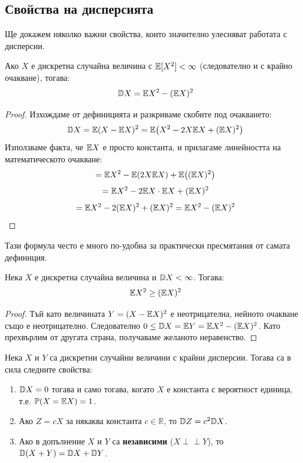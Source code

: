 \subsection{Свойства на дисперсията}

Ще докажем няколко важни свойства, които значително улесняват работата с дисперсии.

\begin{keythm}
Ако $X$ е дискретна случайна величина с $\mathbb{E}[X^2]<\infty$ (следователно и с крайно
очакване), тогава:
\[ \mathbb{D} X = \mathbb{E} X^2 - (\mathbb{E} X)^2 \]
\end{keythm}

\begin{proof}
Изхождаме от дефиницията и разкриваме скобите под очакването:
\[ \mathbb{D} X = \mathbb{E}(X - \mathbb{E} X)^2 = \mathbb{E}\big( X^2 - 2X\mathbb{E} X + (\mathbb{E} X)^2 \big) \]
Използваме факта, че $\mathbb{E} X$ е просто константа, и прилагаме линейността на математическото очакване:
\[ = \mathbb{E} X^2 - \mathbb{E}(2X\mathbb{E} X) + \mathbb{E}\big( (\mathbb{E} X)^2 \big) \]
\[ = \mathbb{E} X^2 - 2\mathbb{E} X \cdot \mathbb{E} X + (\mathbb{E} X)^2 \]
\[ = \mathbb{E} X^2 - 2(\mathbb{E} X)^2 + (\mathbb{E} X)^2 = \mathbb{E} X^2 - (\mathbb{E} X)^2 \]
\end{proof}

Тази формула често е много по-удобна за практически пресмятания от самата дефиниция.

\begin{cor}
Нека $X$ е дискретна случайна величина и $\mathbb{D} X < \infty$. Тогава:
\[ \mathbb{E} X^2 \ge (\mathbb{E} X)^2 \]
\end{cor}

\begin{proof}
Тъй като величината $Y = (X - \mathbb{E} X)^2$ е неотрицателна, нейното очакване също е неотрицателно. Следователно $0 \le \mathbb{D} X = \mathbb{E} Y = \mathbb{E} X^2 - (\mathbb{E} X)^2$. Като прехвърлим от другата страна, получаваме желаното неравенство.
\end{proof}

\begin{prop}\label{prop:var-props}
Нека $X$ и $Y$ са дискретни случайни величини с крайни дисперсии. Тогава са в сила следните свойства:
\begin{enumerate}
    \item[а)] $\mathbb{D} X = 0$ тогава и само тогава, когато $X$ е константа с вероятност
    единица, т.е. $\mathbb{P}(X = \mathbb{E} X) = 1$.
    \item[б)] Ако $Z = cX$ за някаква константа $c \in \mathbb{R}$, то $\mathbb{D} Z = c^2 \mathbb{D} X$.
    \item[в)] Ако в допълнение $X$ и $Y$ са \textbf{независими} ($X \perp\!\!\!\perp Y$), то $\mathbb{D}(X + Y) = \mathbb{D} X + \mathbb{D} Y$.
\end{enumerate}
\end{prop}

